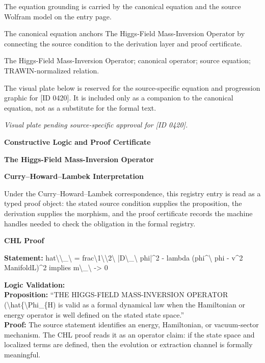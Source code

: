The equation grounding is carried by the canonical equation and the source Wolfram model on the entry page.

The canonical equation anchors The Higgs-Field Mass-Inversion Operator by connecting the source condition to the derivation layer and proof certificate.

The Higgs-Field Mass-Inversion Operator; canonical operator; source equation; TRAWIN-normalized relation.
\endgroup

\begingroup\footnotesize\sloppy
The visual plate below is reserved for the source-specific equation and progression graphic for [ID 0420]. It is included only as a companion to the canonical equation, not as a substitute for the formal text.
\par\endgroup
\begingroup\footnotesize\itshape
Visual plate pending source-specific approval for [ID 0420].
\par\endgroup

\clearpage
\begingroup\tzpsupportsetup
\noindent\textbf{\fontsize{10.8pt}{12.8pt}\selectfont [ID 0420] Constructive Logic and Proof Certificate}\par
\noindent\textbf{\fontsize{10pt}{12pt}\selectfont The Higgs-Field Mass-Inversion Operator}\par
\vspace{0.45em}
\begingroup
\footnotesize
\setlength{\parskip}{0.22em}
\setlength{\parindent}{0pt}
\noindent\textbf{Curry--Howard--Lambek Interpretation}\par
Under the Curry--Howard--Lambek correspondence, this registry entry is read as a typed proof
object: the stated source condition supplies the proposition, the derivation supplies the
morphism, and the proof certificate records the machine handles needed to check the obligation
in the formal registry.

\vspace{0.45em}
\noindent\textbf{CHL Proof}\par
\textbf{Statement:} hat\textbackslash{}\textbackslash{}\_\textbackslash{} = frac\textbackslash{}1\textbackslash{}\textbackslash{}2\textbackslash{} |D\textbackslash{}\_\textbackslash{} phi|\textasciicircum{}2 - lambda (phi\textasciicircum{}\textbackslash{} phi - v\textasciicircum{}2 ManifoldL)\textasciicircum{}2 implies m\textbackslash{}\_\textbackslash{} ->
0

\textbf{Logic Validation:}\\
\textbf{Proposition:} ``THE HIGGS-FIELD MASS-INVERSION OPERATOR (\textbackslash{}hat\{\textbackslash{}Phi\_\{H) is valid as a formal dynamical
law when the Hamiltonian or energy operator is well defined on the stated state space.''\\
\textbf{Proof:} The source statement identifies an energy, Hamiltonian, or vacuum-sector mechanism. The
CHL proof reads it as an operator claim: if the state space and localized terms are
defined, then the evolution or extraction channel is formally meaningful.

